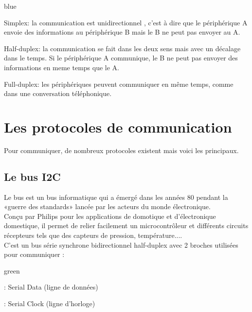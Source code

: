 \begin{items}{blue}{\Triangle}
    \item Simplex: la communication est unidirectionnel , c'est à dire que le périphérique A envoie des informations au périphérique B mais le B ne peut pas envoyer au A. \\
    \item Half-duplex: la communication se fait dans les deux sens mais avec un décalage dans le temps. Si le périphérique A communique, le B ne peut pas envoyer des informations en meme temps que le A. \\
    \item Full-duplex: les périphériques peuvent communiquer en même temps, comme dans une conversation téléphonique.
\end{items}

\section{Les protocoles de communication}

Pour communiquer, de nombreux protocoles existent mais voici les principaux.

\subsection{Le bus I2C}

Le bus  est un bus informatique qui a émergé dans les années 80 pendant la «guerre des standards» lancée par les acteurs du monde électronique.\\
Conçu par Philips pour les applications de domotique et d’électronique domestique, il permet de relier facilement un microcontrôleur et différents circuits récepteurs tels que des capteurs de pression, température....\\

C'est un bus série synchrone bidirectionnel half-duplex avec 2 broches utilisées pour communiquer :
\begin{items}{green}{\Triangle}
    \item {} : Serial Data (ligne de données) 
    \item {} : Serial Clock (ligne d'horloge) 
\end{items}

